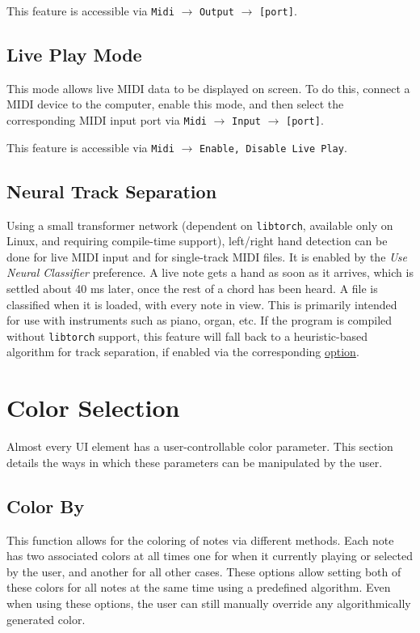 \documentclass[english]{article}
\providecommand{\mi}[1]{\texttt{#1}}
\begin{document}
This feature is accessible via 
\mi{Midi} $\rightarrow$ \mi{Output} $\rightarrow$ \mi{[port]}.

\subsection{Live Play Mode}
\label{subsec:liveplay}

This mode allows live MIDI data to be displayed on screen. To do this, connect a MIDI device to the computer, enable
this mode, and then select the corresponding MIDI input port via 
\mi{Midi} $\rightarrow$ \mi{Input} $\rightarrow$ \mi{[port]}.

This feature is accessible via 
\mi{Midi} $\rightarrow$ \mi{{Enable, Disable} Live Play}.

\subsection{Neural Track Separation}
\label{subsec:lstm}

Using a small transformer network (dependent on \mi{libtorch}, available only on Linux, and requiring compile-time support), left/right hand detection can be done for live MIDI input and for single-track MIDI files. It is enabled by the \textit{Use Neural Classifier} preference. A live note gets a hand as soon as it arrives, which is settled about 40 ms later, once the rest of a chord has been heard. A file is classified when it is loaded, with every note in view. This is primarily intended for use with instruments such as piano, organ, etc. If the program is compiled without \mi{libtorch} support, this feature will fall back to a heuristic-based algorithm for track separation, if enabled via the corresponding
\textcolor{lcol}{\hyperref[subsec:adaptivetrackdivision]{option}}.

\section{Color Selection}

Almost every UI element has a user-controllable color parameter. This section details the ways in which these
parameters can be manipulated by the user.

\subsection{Color By}

This function allows for the coloring of notes via different methods. Each note has two associated colors at all times
\textendash{} one for when it currently playing or selected by the user, and another for all other cases. These options allow
setting both of these colors for all notes at the same time using a predefined algorithm. Even when using these options,
the user can still manually override any algorithmically generated color.
\end{document}
